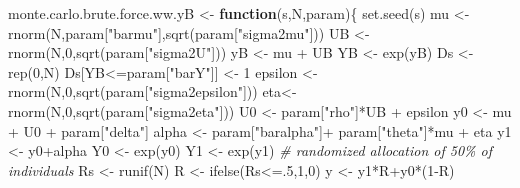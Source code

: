\documentclass[
]{book}
\newenvironment{Shaded}{\begin{snugshade}}{\end{snugshade}}
\newcommand{\CommentTok}[1]{\textcolor[rgb]{0.56,0.35,0.01}{\textit{#1}}}
\newcommand{\ControlFlowTok}[1]{\textcolor[rgb]{0.13,0.29,0.53}{\textbf{#1}}}
\newcommand{\DecValTok}[1]{\textcolor[rgb]{0.00,0.00,0.81}{#1}}
\newcommand{\FunctionTok}[1]{\textcolor[rgb]{0.00,0.00,0.00}{#1}}
\newcommand{\NormalTok}[1]{#1}
\newcommand{\OtherTok}[1]{\textcolor[rgb]{0.56,0.35,0.01}{#1}}
\newcommand{\SpecialCharTok}[1]{\textcolor[rgb]{0.00,0.00,0.00}{#1}}
\newcommand{\StringTok}[1]{\textcolor[rgb]{0.31,0.60,0.02}{#1}}
\theoremstyle{definition}
\theoremstyle{definition}
\theoremstyle{definition}
\theoremstyle{definition}
\theoremstyle{remark}
\begin{document}
\begin{Shaded}
\begin{Highlighting}[]
\NormalTok{monte.carlo.brute.force.ww.yB }\OtherTok{\textless{}{-}} \ControlFlowTok{function}\NormalTok{(s,N,param)\{}
  \FunctionTok{set.seed}\NormalTok{(s)}
\NormalTok{  mu }\OtherTok{\textless{}{-}} \FunctionTok{rnorm}\NormalTok{(N,param[}\StringTok{"barmu"}\NormalTok{],}\FunctionTok{sqrt}\NormalTok{(param[}\StringTok{"sigma2mu"}\NormalTok{]))}
\NormalTok{  UB }\OtherTok{\textless{}{-}} \FunctionTok{rnorm}\NormalTok{(N,}\DecValTok{0}\NormalTok{,}\FunctionTok{sqrt}\NormalTok{(param[}\StringTok{"sigma2U"}\NormalTok{]))}
\NormalTok{  yB }\OtherTok{\textless{}{-}}\NormalTok{ mu }\SpecialCharTok{+}\NormalTok{ UB }
\NormalTok{  YB }\OtherTok{\textless{}{-}} \FunctionTok{exp}\NormalTok{(yB)}
\NormalTok{  Ds }\OtherTok{\textless{}{-}} \FunctionTok{rep}\NormalTok{(}\DecValTok{0}\NormalTok{,N)}
\NormalTok{  Ds[YB}\SpecialCharTok{\textless{}=}\NormalTok{param[}\StringTok{"barY"}\NormalTok{]] }\OtherTok{\textless{}{-}} \DecValTok{1} 
\NormalTok{  epsilon }\OtherTok{\textless{}{-}} \FunctionTok{rnorm}\NormalTok{(N,}\DecValTok{0}\NormalTok{,}\FunctionTok{sqrt}\NormalTok{(param[}\StringTok{"sigma2epsilon"}\NormalTok{]))}
\NormalTok{  eta}\OtherTok{\textless{}{-}} \FunctionTok{rnorm}\NormalTok{(N,}\DecValTok{0}\NormalTok{,}\FunctionTok{sqrt}\NormalTok{(param[}\StringTok{"sigma2eta"}\NormalTok{]))}
\NormalTok{  U0 }\OtherTok{\textless{}{-}}\NormalTok{ param[}\StringTok{"rho"}\NormalTok{]}\SpecialCharTok{*}\NormalTok{UB }\SpecialCharTok{+}\NormalTok{ epsilon}
\NormalTok{  y0 }\OtherTok{\textless{}{-}}\NormalTok{ mu }\SpecialCharTok{+}\NormalTok{  U0 }\SpecialCharTok{+}\NormalTok{ param[}\StringTok{"delta"}\NormalTok{]}
\NormalTok{  alpha }\OtherTok{\textless{}{-}}\NormalTok{ param[}\StringTok{"baralpha"}\NormalTok{]}\SpecialCharTok{+}\NormalTok{  param[}\StringTok{"theta"}\NormalTok{]}\SpecialCharTok{*}\NormalTok{mu }\SpecialCharTok{+}\NormalTok{ eta}
\NormalTok{  y1 }\OtherTok{\textless{}{-}}\NormalTok{ y0}\SpecialCharTok{+}\NormalTok{alpha}
\NormalTok{  Y0 }\OtherTok{\textless{}{-}} \FunctionTok{exp}\NormalTok{(y0)}
\NormalTok{  Y1 }\OtherTok{\textless{}{-}} \FunctionTok{exp}\NormalTok{(y1)}
  \CommentTok{\# randomized allocation of 50\% of individuals}
\NormalTok{  Rs }\OtherTok{\textless{}{-}} \FunctionTok{runif}\NormalTok{(N)}
\NormalTok{  R }\OtherTok{\textless{}{-}} \FunctionTok{ifelse}\NormalTok{(Rs}\SpecialCharTok{\textless{}=}\NormalTok{.}\DecValTok{5}\NormalTok{,}\DecValTok{1}\NormalTok{,}\DecValTok{0}\NormalTok{)}
\NormalTok{  y }\OtherTok{\textless{}{-}}\NormalTok{ y1}\SpecialCharTok{*}\NormalTok{R}\SpecialCharTok{+}\NormalTok{y0}\SpecialCharTok{*}\NormalTok{(}\DecValTok{1}\SpecialCharTok{{-}}\NormalTok{R)}

\end{Highlighting}
\end{Shaded}
\end{document}
